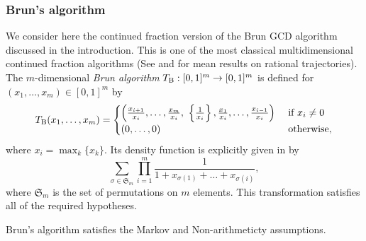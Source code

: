\documentclass[12pt,a4paper,reqno]{amsart}
\begin{document}
\subsubsection{Brun's algorithm}\label{ex:Brun}
We consider
here  the continued fraction   version of the Brun GCD algorithm discussed  in the introduction.
This is   one of  the  most classical  multidimensional continued fraction algorithms (See \cite{Brun19,Brun20,BRUN,Schweiger:00} and  \cite{BLV:18} for  mean results  on rational trajectories). The $m$-dimensional \emph{Brun algorithm}  $T_{\rm B}:[0,1]^m \to [0,1]^m$  is
defined  for  $(x_1, \ldots, x_m) \in [0,1]^m$  
by
$$
T_{\rm B}(x_1, \ldots, x_m)
=\begin{cases}  \left(  \frac{x_{i+1}}{x_i}, \ldots, \frac{x_m}{x_i }, \ \left\{ \frac{1}{x_i}\right\}, \frac{x_{1}}{x_i}, \ldots,  \frac{x_{i - 1}}{x_i}
\right)& \hbox{ if } x_i \neq 0\\
 (0,\ldots, 0)&  \hbox{ otherwise},
 \end{cases}
$$
where $x_i = \max_{k} \{x_k\}$. Its density function is  explicitly given in \cite{Schweiger79,Arnoux-Nogueira} by 
\[ 
\sum_{\sigma \in \mathfrak{S}_{m}} \prod_{i=1}^{m}  \frac{1}{1+x_{\sigma(1)}+\ldots+x_{\sigma(i)}},
\]
where $ \mathfrak{S}_m$   is the set of permutations on  $m$ elements. This transformation  satisfies  all of the required  hypotheses. 

\begin{proposition}
Brun's algorithm satisfies the Markov and Non-arithmeticty assumptions.
\end{proposition}
\end{document}
